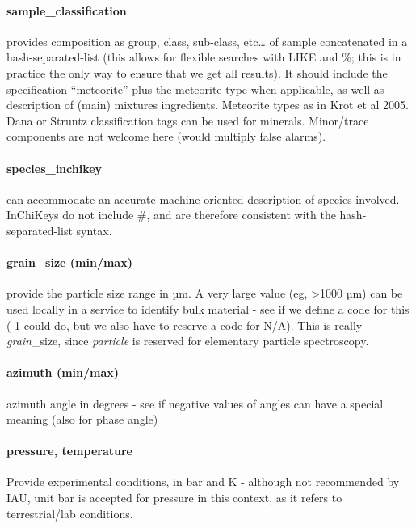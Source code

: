 \documentclass[11pt,a4paper]{ivoa}
\begin{document}
\paragraph{sample\_classification}

provides composition as group, class, sub-class, etc… of sample concatenated in a hash-separated-list (this allows for flexible searches with LIKE and \%; this is in practice the only way to ensure that we get all results). It should include the specification ``meteorite'' plus the meteorite type when applicable, as well as description of (main) mixtures ingredients. Meteorite types as in Krot et al 2005. Dana or Struntz classification tags can be used for minerals. Minor/trace components are not welcome here (would multiply false alarms).

\paragraph{\textbf{species\_inchikey} }

can accommodate an accurate machine-oriented description of species involved. InChiKeys do not include \#, and are therefore consistent with the hash-separated-list syntax.

\paragraph{grain\_size (min/max)}

provide the particle size range in µm. A very large value (eg, >1000 µm) can be used locally in a service to identify bulk material - see if we define a code for this (-1 could do, but we also have to reserve a code for N/A). This is really \emph{grain}\_size, since \emph{particle} is reserved for elementary particle spectroscopy.\\

\paragraph{azimuth (min/max)}

azimuth angle in degrees - see if negative values of angles can have a special meaning (also for phase angle)

\paragraph{pressure, temperature}

Provide experimental conditions, in bar and K - although not recommended by IAU, unit bar is accepted for pressure in this context, as it refers to terrestrial/lab conditions.
\end{document}
